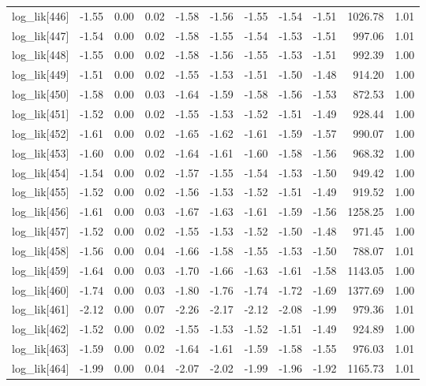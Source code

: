 \begin{table}[ht]
\begin{tabular}{rrrrrrrrrrr}
  log\_lik[446] & -1.55 & 0.00 & 0.02 & -1.58 & -1.56 & -1.55 & -1.54 & -1.51 & 1026.78 & 1.01 \\ 
  log\_lik[447] & -1.54 & 0.00 & 0.02 & -1.58 & -1.55 & -1.54 & -1.53 & -1.51 & 997.06 & 1.01 \\ 
  log\_lik[448] & -1.55 & 0.00 & 0.02 & -1.58 & -1.56 & -1.55 & -1.53 & -1.51 & 992.39 & 1.00 \\ 
  log\_lik[449] & -1.51 & 0.00 & 0.02 & -1.55 & -1.53 & -1.51 & -1.50 & -1.48 & 914.20 & 1.00 \\ 
  log\_lik[450] & -1.58 & 0.00 & 0.03 & -1.64 & -1.59 & -1.58 & -1.56 & -1.53 & 872.53 & 1.00 \\ 
  log\_lik[451] & -1.52 & 0.00 & 0.02 & -1.55 & -1.53 & -1.52 & -1.51 & -1.49 & 928.44 & 1.00 \\ 
  log\_lik[452] & -1.61 & 0.00 & 0.02 & -1.65 & -1.62 & -1.61 & -1.59 & -1.57 & 990.07 & 1.00 \\ 
  log\_lik[453] & -1.60 & 0.00 & 0.02 & -1.64 & -1.61 & -1.60 & -1.58 & -1.56 & 968.32 & 1.00 \\ 
  log\_lik[454] & -1.54 & 0.00 & 0.02 & -1.57 & -1.55 & -1.54 & -1.53 & -1.50 & 949.42 & 1.00 \\ 
  log\_lik[455] & -1.52 & 0.00 & 0.02 & -1.56 & -1.53 & -1.52 & -1.51 & -1.49 & 919.52 & 1.00 \\ 
  log\_lik[456] & -1.61 & 0.00 & 0.03 & -1.67 & -1.63 & -1.61 & -1.59 & -1.56 & 1258.25 & 1.00 \\ 
  log\_lik[457] & -1.52 & 0.00 & 0.02 & -1.55 & -1.53 & -1.52 & -1.50 & -1.48 & 971.45 & 1.00 \\ 
  log\_lik[458] & -1.56 & 0.00 & 0.04 & -1.66 & -1.58 & -1.55 & -1.53 & -1.50 & 788.07 & 1.01 \\ 
  log\_lik[459] & -1.64 & 0.00 & 0.03 & -1.70 & -1.66 & -1.63 & -1.61 & -1.58 & 1143.05 & 1.00 \\ 
  log\_lik[460] & -1.74 & 0.00 & 0.03 & -1.80 & -1.76 & -1.74 & -1.72 & -1.69 & 1377.69 & 1.00 \\ 
  log\_lik[461] & -2.12 & 0.00 & 0.07 & -2.26 & -2.17 & -2.12 & -2.08 & -1.99 & 979.36 & 1.01 \\ 
  log\_lik[462] & -1.52 & 0.00 & 0.02 & -1.55 & -1.53 & -1.52 & -1.51 & -1.49 & 924.89 & 1.00 \\ 
  log\_lik[463] & -1.59 & 0.00 & 0.02 & -1.64 & -1.61 & -1.59 & -1.58 & -1.55 & 976.03 & 1.01 \\ 
  log\_lik[464] & -1.99 & 0.00 & 0.04 & -2.07 & -2.02 & -1.99 & -1.96 & -1.92 & 1165.73 & 1.01 \\ 

\end{tabular}
\end{table}
